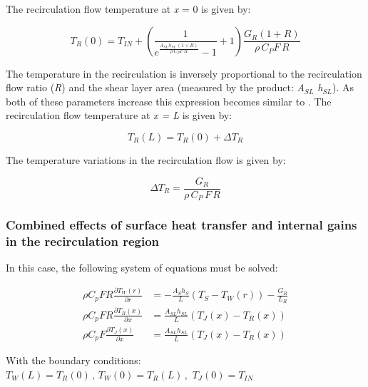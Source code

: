 {The recirculation flow temperature at \emph{x} = 0 is given by:

\begin{equation}
{T_R}(0) = {T_{IN}} + \left( {\frac{1}{{{e^{\frac{{{A_{SL}}{h_{SL}}\,(1 + R)}}{{\rho \,{C_P}F\,R}}}} - 1}} + 1} \right)\frac{{{G_R}(1 + R)}}{{\rho \,{C_P}F\,R}}
\end{equation}

The temperature in the recirculation is inversely proportional to the recirculation flow ratio (\emph{R}) and the shear layer area (measured by the product: \emph{A\(_{SL}\) h\(_{SL}\)}). As both of these parameters increase this expression becomes similar to . The recirculation flow temperature at \emph{x = L} is given by:

\begin{equation}
{T_R}(L) = {T_R}(0) + \Delta {T_R}
\end{equation}

The temperature variations in the recirculation flow is given by:

\begin{equation}
\Delta {T_R} = \frac{{{G_R}}}{{\rho \,{C_P}\,F\,R}}
\end{equation}

\subsubsection{Combined effects of surface heat transfer and internal gains in the recirculation region}\label{combined-effects-of-surface-heat-transfer-and-internal-gains-in-the-recirculation-region}

In this case, the following system of equations must be solved:

\begin{equation}
\begin{array}{rl}
    \rho C_p F R \frac{\partial T_W \left(r\right)}{\partial r} & = -\frac{A_S h_S}{L} \left(T_S - T_W \left(r\right)\right) - \frac{G_R}{L_R} \\
    \rho C_p F R \frac{\partial T_R \left(x\right)}{\partial x} & = \frac{A_{SL} h_{SL}}{L} \left(T_J\left(x\right) - T_R \left(x\right)\right) \\
    \rho C_p F \frac{\partial T_J \left(x\right)}{\partial x} & = \frac{A_{SL} h_{SL}}{L} \left(T_J\left(x\right) - T_R \left(x\right)\right) 
  \end{array}
\end{equation}

With the boundary conditions: \({T_W}(L) = {T_R}(0)\,,\,{T_W}(0) = {T_R}(L)\,,\,\,{T_J}(0) = {T_{IN}}\)

}
